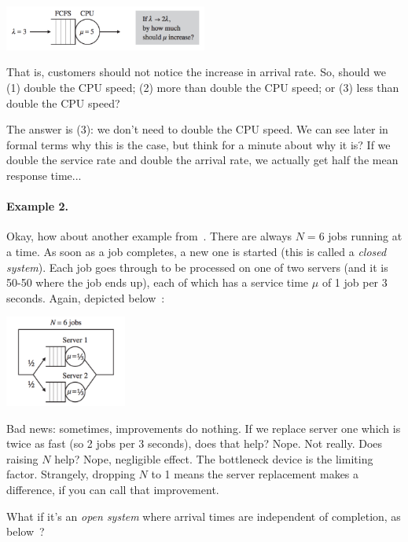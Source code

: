 \documentclass[a4paper]{report}
\begin{document}
\begin{center}
	\includegraphics[width=0.5\textwidth]{images/qt-example1.png}
\end{center}

That is, customers should not notice the increase in arrival rate. So, should we (1) double the CPU speed; (2) more than double the CPU speed; or (3) less than double the CPU speed?

The answer is (3): we don't need to double the CPU speed. We can see later in formal terms why this is the case, but think for a minute about why it is? If we double the service rate and double the arrival rate, we actually get half the mean response time...

\paragraph{Example 2.} Okay, how about another example from~\cite{pmd}. There are always $N=6$ jobs running at a time. As soon as a job completes, a new one is started (this is called a \textit{closed system}). Each job goes through to be processed on one of two servers (and it is 50-50 where the job ends up), each of which has a service time $\mu$ of 1 job per 3 seconds. Again, depicted below~\cite{pmd}:


\begin{center}
	\includegraphics[width=0.3\textwidth]{images/qt-example2.png}
\end{center}

Bad news: sometimes, improvements do nothing. If we replace server one which is twice as fast (so 2 jobs per 3 seconds), does that help? Nope. Not really. Does raising $N$ help? Nope, negligible effect. The bottleneck device is the limiting factor. Strangely, dropping $N$ to 1 means the server replacement makes a difference, if you can call that improvement. 

What if it's an \textit{open system} where arrival times are independent of completion, as below~\cite{pmd}?
\end{document}
